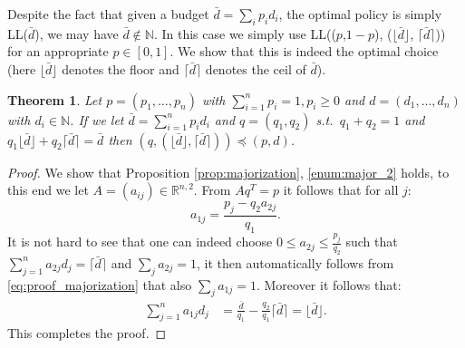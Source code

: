 \documentclass[12pt]{report}
\newcommand{\R}{\mathbb{R}}
\newtheorem{theorem}{Theorem}
\begin{document}
Despite the fact that given a budget $\bar d = \sum_i p_i d_i$, the optimal policy is simply LL($\bar d$), we may have $\bar d \notin \mathbb{N}$. In this case we simply use LL(($p$,$1-p$), ($\lfloor \bar d \rfloor$, $\lceil \bar d \rceil$)) for an appropriate $p\in [0,1]$. We show that this is indeed the optimal choice (here $\lfloor \bar d \rfloor$ denotes the floor and $\lceil \bar d \rceil$ denotes the ceil of $\bar d$).
\begin{theorem}
Let $p=(p_1,\dots,p_n)$ with $\sum_{i=1}^n p_i=1, p_i \geq 0$ and $d=(d_1,\dots,d_n)$ with $d_i \in \mathbb{N}$. If we let $\bar d=\sum_{i=1}^n p_i d_i$ and $q=(q_1,q_2)$ s.t.~$q_1+q_2=1$ and $q_1 \lfloor \bar d \rfloor + q_2 \lceil \bar d \rceil = \bar d$ then $(q,(\lfloor \bar d \rfloor, \lceil \bar d \rceil)) \preceq (p,d)$.
\end{theorem}
\begin{proof}
We show that Proposition \ref{prop:majorization}, \eqref{enum:major_2} holds, to this end we let $A= (a_{ij}) \in \R^{n,2}$. From $Aq^T = p$ it follows that for all $j$:
\begin{equation}\label{eq:proof_majorization}
a_{1j} = \frac{p_j - q_2 a_{2j}}{q_1}.
\end{equation}
It is not hard to see that one can indeed choose $0 \leq a_{2j} \leq \frac{p_j}{q_2}$ such  that $\sum_{j=1}^n a_{2j} d_j = \lceil \bar d \rceil$ and $\sum_j a_{2j} = 1$, it then automatically follows from \eqref{eq:proof_majorization} that also $\sum_j a_{1j} =1$. Moreover it follows that:
\begin{align*}
\sum_{j=1}^n a_{1j} d_j
&= \frac{\bar d}{q_1} - \frac{q_2}{q_1} \lceil \bar d \rceil = \lfloor \bar d \rfloor.
\end{align*}
This completes the proof.
\end{proof}
\end{document}
